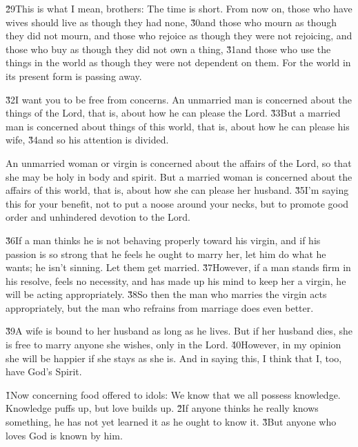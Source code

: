 \v{29}This is what I mean, brothers: The time is short. From now on, those who have wives should live as though they had none, \v{30}and those who mourn as though they did not mourn, and those who rejoice as though they were not rejoicing, and those who buy as though they did not own a thing, \v{31}and those who use the things in the world as though they were not dependent on them. For the world in its present form is passing away.

\v{32}I want you to be free from concerns. An unmarried man is concerned about the things of the Lord, that is, about how he can please the Lord. \v{33}But a married man is concerned about things of this world, that is, about how he can please his wife, \v{34}and so his attention is divided.

An unmarried woman or virgin is concerned about the affairs of the Lord, so that she may be holy in body and spirit. But a married woman is concerned about the affairs of this world, that is, about how she can please her husband. \v{35}I'm saying this for your benefit, not to put a noose around your necks, but to promote good order and unhindered devotion to the Lord.

\v{36}If a man thinks he is not behaving properly toward his virgin, and if his passion is so strong that he feels he ought to marry her, let him do what he wants; he isn't sinning. Let them get married. \v{37}However, if a man stands firm in his resolve, feels no necessity, and has made up his mind to keep her a virgin, he will be acting appropriately. \v{38}So then the man who marries the virgin acts appropriately, but the man who refrains from marriage does even better.

\v{39}A wife is bound to her husband as long as he lives. But if her husband dies, she is free to marry anyone she wishes, only in the Lord. \v{40}However, in my opinion she will be happier if she stays as she is. And in saying this, I think that I, too, have God's Spirit.

\v{1}Now concerning food offered to idols: We know that we all possess knowledge. Knowledge puffs up, but love builds up. \v{2}If anyone thinks he really knows something, he has not yet learned it as he ought to know it. \v{3}But anyone who loves God is known by him.

